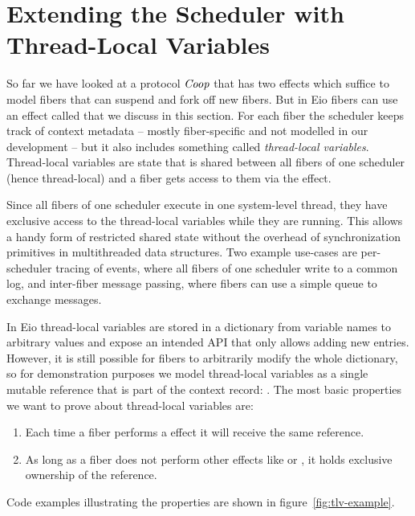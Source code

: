 \section{Extending the Scheduler with Thread-Local Variables}
\label{sec:thread-local-vars}


So far we have looked at a protocol \(\emph{Coop}{}\) that has two effects which suffice to model fibers that can suspend and fork off new fibers.
But in Eio fibers can use an effect called \egetctx{} that we discuss in this section.
For each fiber the scheduler keeps track of context metadata -- mostly fiber-specific and not modelled in our development -- but it also includes something called \emph{thread-local variables}.
Thread-local variables are state that is shared between all fibers of one scheduler (hence thread-local) and a fiber gets access to them via the \egetctx{} effect.


Since all fibers of one scheduler execute in one system-level thread, they have exclusive access to the thread-local variables while they are running.
This allows a handy form of restricted shared state without the overhead of synchronization primitives in multithreaded data structures.
Two example use-cases are per-scheduler tracing of events, where all fibers of one scheduler write to a common log,
and inter-fiber message passing, where fibers can use a simple queue to exchange messages.


In Eio thread-local variables are stored in a dictionary from variable names to arbitrary values and expose an intended API that only allows adding new entries.
However, it is still possible for fibers to arbitrarily modify the whole dictionary, so for demonstration purposes we model thread-local variables as a single mutable reference that is part of the context record: .
The most basic properties we want to prove about thread-local variables are:
\begin{enumerate}
  \item Each time a fiber performs a \egetctx{} effect it will receive the same reference.
  \item As long as a fiber does not perform other effects like \efork{} or \esuspend{}, it holds exclusive ownership of the reference.
\end{enumerate}
Code examples illustrating the properties are shown in figure~\ref{fig:tlv-example}.

